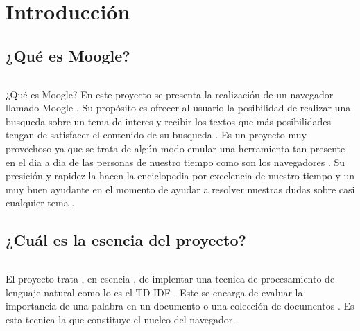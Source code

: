 \documentclass[11pt]{beamer}
\begin{document}
	\section{Introducción}
	
	
	
	\subsection{¿Qué es Moogle?}
	\begin{frame}
		\begin{columns}
			\begin{column}{.4\textwidth}
				\tableofcontents[sections={1-2},currentsection, currentsubsection]
			\end{column}
			\begin{column}{.4\textwidth}
				\tableofcontents[sections={3-4},currentsection , currentsubsection]
			\end{column}
		\end{columns}
	\end{frame}
	\begin{frame}{¿Qué es Moogle?}
		\justifying
		En este proyecto se presenta la realización de un navegador llamado Moogle . Su propósito es ofrecer al usuario la posibilidad de realizar una busqueda sobre un tema de interes y recibir los textos que más posibilidades tengan de satisfacer el contenido de su busqueda . Es un proyecto muy provechoso ya que se trata de algún modo emular una herramienta tan presente en el dia a dia de las personas de nuestro tiempo como son los navegadores . Su presición y rapidez la hacen la enciclopedia por excelencia de nuestro tiempo y un muy buen ayudante en el momento de ayudar a resolver nuestras dudas sobre casi cualquier tema . 
	\end{frame}
	\subsection{¿Cuál es la esencia del proyecto?}
	\begin{frame}
		\begin{columns}
			\begin{column}{.4\textwidth}
				\tableofcontents[sections={1-2},currentsection, currentsubsection]
			\end{column}
			\begin{column}{.4\textwidth}
				\tableofcontents[sections={3-4},currentsection , currentsubsection]
			\end{column}
		\end{columns}
	\end{frame}
	\begin{frame}
		El proyecto trata , en esencia , de implentar una tecnica de procesamiento de lenguaje natural como lo es el TD-IDF . Este se encarga de evaluar la importancia de una palabra en un documento o una colección de documentos . Es esta tecnica la que constituye el nucleo  del  navegador .
	\end{frame}
\end{document}
